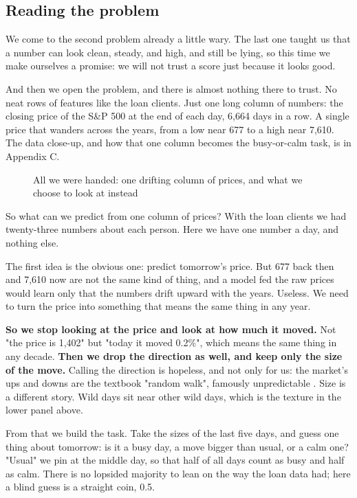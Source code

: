 \documentclass[11pt]{article} %
\begin{document}
\subsection{Reading the problem}


We come to the second problem already a little wary. The last one taught us that a number can look clean, steady, and high, and still be lying, so this time we make ourselves a promise: we will not trust a score just because it looks good.

And then we open the problem, and there is almost nothing there to trust. No neat rows of features like the loan clients. Just one long column of numbers: the closing price of the S\&P 500 at the end of each day, 6,664 days in a row. A single price that wanders across the years, from a low near 677 to a high near 7,610. The data close-up, and how that one column becomes the busy-or-calm task, is in Appendix C.

\begin{figure}[htbp]
\centering

\caption{All we were handed: one drifting column of prices, and what we choose to look at instead}
\end{figure}


So what can we predict from one column of prices? With the loan clients we had twenty-three numbers about each person. Here we have one number a day, and nothing else.

The first idea is the obvious one: predict tomorrow's price. But 677 back then and 7,610 now are not the same kind of thing, and a model fed the raw prices would learn only that the numbers drift upward with the years. Useless. We need to turn the price into something that means the same thing in any year.

\textbf{So we stop looking at the price and look at how much it moved.} Not "the price is 1,402" but "today it moved 0.2\%", which means the same thing in any decade. \textbf{Then we drop the direction as well, and keep only the size of the move.} Calling the direction is hopeless, and not only for us: the market's ups and downs are the textbook "random walk", famously unpredictable \cite{malkiel:1973}. Size is a different story. Wild days sit near other wild days, which is the texture in the lower panel above.

From that we build the task. Take the sizes of the last five days, and guess one thing about tomorrow: is it a busy day, a move bigger than usual, or a calm one? "Usual" we pin at the middle day, so that half of all days count as busy and half as calm. There is no lopsided majority to lean on the way the loan data had; here a blind guess is a straight coin, 0.5.
\end{document}
